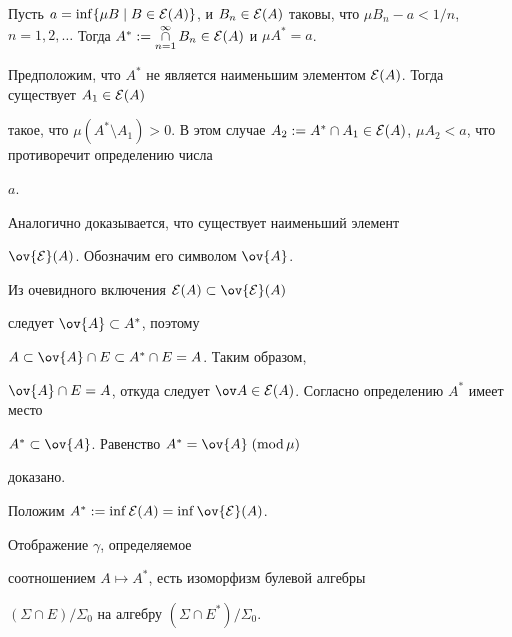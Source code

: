\begin{pf} Пусть $a=\inf\{\mu B\mid B\in{\cal E}(A)\}$, и $B_n\in{\cal


E}(A)$ таковы, что $\mu B_n-a<1/n$, $n=1,2,\dotsc$ Тогда $A^\ast:=


\mathop{\cap}\limits_{n=1}^\infty B_n\in{\cal E}(A)$ и $\mu A^\ast=a$.





Предположим, что $A^\ast$ не является наименьшим элементом ${\cal


E}(A)$. Тогда существует $A_1\in{\cal E}(A)$


такое, что $\mu(A^\ast\setminus A_1)>0$. В этом случае $A_2:= A^\ast\cap


A_1\in{\cal E}(A)$, $\mu A_2<a$, что противоречит определению числа


$a$.





Аналогично доказывается, что существует наименьший элемент


$\ov{\cal E}(A)$. Обозначим его символом $\ov{A}$.


Из очевидного включения ${\cal E}(A)\subset\ov{\cal E}(A)$


следует $\ov{A}\subset A^\ast$, поэтому


$A\subset\ov{A}\cap E\subset A^\ast\cap E=A$. Таким образом,


$\ov{A}\cap E=A$, откуда следует $\ov A\in{\cal


E}(A)$. Согласно определению $A^\ast$ имеет место


$A^\ast\subset\ov{A}$. Равенство $A^\ast=\ov{A}\moddd$


доказано.


\end{pf}





Положим $A^\ast:=\inf{\cal E}(A)=\inf\ov{\cal E}(A)$.





\begin{lem}


Отображение $\gamma$, определяемое


соотношением $A\mapsto A^\ast$, есть изоморфизм булевой алгебры


$(\Sigma\cap E)/\Sigma_0$ на алгебру $(\Sigma\cap E^\ast)/\Sigma_0$.


\end{lem}





